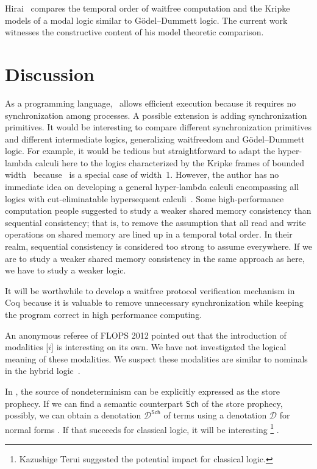 Hirai~\cite{hirailpar,hiraimaster} compares the temporal order of waitfree
computation and the Kripke models of a modal logic similar to
G\"odel--Dummett logic.  The current
work witnesses the constructive content of
his model theoretic comparison.

\section{Discussion}
\label{future}

As a programming language, \lgd\, allows efficient execution because it
requires no synchronization among processes.
A possible extension is adding synchronization primitives.
It would be interesting to compare different synchronization primitives
and different intermediate logics, generalizing waitfreedom and
G\"odel--Dummett logic.
For example, it would be tedious but straightforward to adapt the
hyper-lambda calculi here to
the logics characterized by the Kripke frames of bounded
width~\citep{Ciabattoni01042001} because \lgd\, is a special case of
width~1.  However, the author has no immediate idea on
developing a general hyper-lambda calculi encompassing
all logics with cut-eliminatable hypersequent calculi~\citep{alg}.
Some high-performance computation people suggested to study a weaker
shared memory consistency than sequential consistency; that is, to
remove the assumption that all read and write operations on shared
memory are lined up in a temporal total order.
In their realm, sequential consistency is considered too strong to
assume everywhere.  If we are to study a weaker shared memory
consistency in the same approach as here,
we have to study a weaker logic.

It will be worthwhile to develop a waitfree protocol verification mechanism in Coq
because it is valuable to
remove unnecessary synchronization while keeping the program correct
in high performance computing.

An anonymous referee of FLOPS 2012 pointed out that the introduction of
modalities [$i$] is interesting on its own.
We have not investigated the logical meaning of these modalities.
We suspect these modalities are similar to nominals in the hybrid
logic~\citep{blackburn2000}.

In \lgd, the source of nondeterminism can be explicitly expressed as the
store prophecy.
If we can find a semantic counterpart $\mathsf{Sch}$ of the store
prophecy, possibly, we
can obtain a denotation $\mathcal{D}^\mathsf{Sch}$ of terms
using a denotation $\mathcal{D}$ for normal forms%
.
If that succeeds for classical logic, it will be interesting%
\footnote{Kazushige Terui suggested the potential impact for classical logic.}%
.

